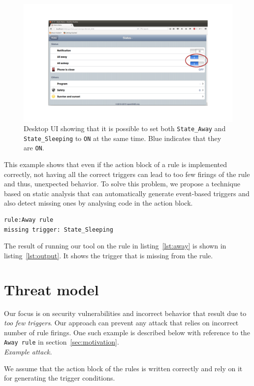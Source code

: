 \documentclass{sig-alternate-05-2015}
\begin{document}
\begin{figure}
\centering
\includegraphics [trim=4cm 5cm 0 5cm, scale=0.14]{images/openhab-runtime.png}
\caption{Desktop UI showing that it is possible to set both \texttt{State\_Away} and \texttt{State\_Sleeping} to \texttt{ON} at the same time. Blue indicates that they are \texttt{ON}.}
\label{fig:awayrule}
\end{figure}
This example shows that even if the action block of a rule is implemented correctly, not having all the correct triggers can lead to too few firings of the rule and thus, unexpected behavior. To solve this problem, we propose a technique based on static analysis that can automatically generate event-based triggers and also detect missing ones by analysing code in the action block. 
\begin{lstlisting}[caption={Missing triggers detection by our tool for the Away rule.},label={lst:output}]
rule:Away rule
missing trigger: State_Sleeping

\end{lstlisting}
The result of running our tool on the rule in listing~\ref{lst:away} is shown in listing~\ref{lst:output}. It shows the trigger that is missing from the rule.

\section{Threat model}
Our focus is on security vulnerabilities and incorrect behavior that result due to \textit{too few triggers}. Our approach can prevent any attack that relies on incorrect number of rule firings. One such example is described below with reference to the \texttt{Away rule} in section~\ref{sec:motivation}.\\
\textit{Example attack.}

We assume that the action block of the rules is written correctly and rely on it for generating the trigger conditions.
\end{document}
